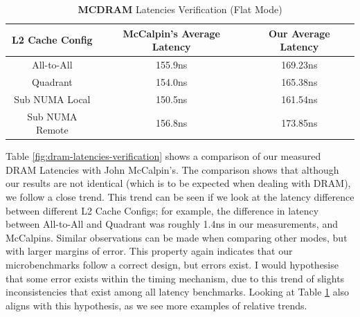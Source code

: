 \documentclass[bsc,frontabs,twoside,singlespacing,parskip,deptreport]{infthesis}     %
\begin{document}
\begin{table}[!h]
\begin{center}
\caption{\textbf{MCDRAM} Latencies Verification (Flat Mode)}
\label{fig:mcdram-latencies-verification}
\begin{tabular}{ |c|c|c| } 
    \hline
    L2 Cache Config  & McCalpin's Average Latency & Our Average Latency \\
    \hline
    All-to-All      & 155.9ns  & 169.23ns \\
    Quadrant        & 154.0ns  & 165.38ns \\
    Sub NUMA Local  & 150.5ns  & 161.54ns \\
    Sub NUMA Remote & 156.8ns  & 173.85ns \\
    \hline
\end{tabular}
\end{center}
\end{table}

Table \ref{fig:dram-latencies-verification} shows a comparison of our measured DRAM Latencies with John McCalpin's. The comparison shows that although our results are not identical (which is to be expected when dealing with DRAM), we follow a close trend. This trend can be seen if we look at the latency difference between different L2 Cache Configs; for example, the difference in latency between All-to-All and Quadrant was roughly 1.4ns in our measurements, and McCalpins. Similar observations can be made when comparing other modes, but with larger margins of error. This property again indicates that our microbenchmarks follow a correct design, but errors exist. I would hypothesise that some error exists within the timing mechanism, due to this trend of slights inconsistencies that exist among all latency benchmarks. Looking at Table \ref{fig:mcdram-latencies-verification} also aligns with this hypothesis, as we see more examples of relative trends.
\end{document}
